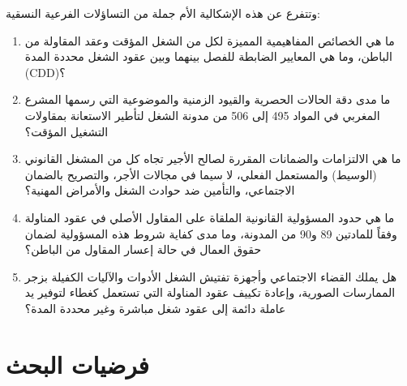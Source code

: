 وتتفرع عن هذه الإشكالية الأم جملة من التساؤلات الفرعية النسقية:
\begin{enumerate}
    \item ما هي الخصائص المفاهيمية المميزة لكل من الشغل المؤقت وعقد المقاولة من الباطن، وما هي المعايير الضابطة للفصل بينهما وبين عقود الشغل محددة المدة (CDD)؟
    \item ما مدى دقة الحالات الحصرية والقيود الزمنية والموضوعية التي رسمها المشرع المغربي في المواد 495 إلى 506 من مدونة الشغل لتأطير الاستعانة بمقاولات التشغيل المؤقت؟
    \item ما هي الالتزامات والضمانات المقررة لصالح الأجير تجاه كل من المشغل القانوني (الوسيط) والمستعمل الفعلي، لا سيما في مجالات الأجر، والتصريح بالضمان الاجتماعي، والتأمين ضد حوادث الشغل والأمراض المهنية؟
    \item ما هي حدود المسؤولية القانونية الملقاة على المقاول الأصلي في عقود المناولة وفقاً للمادتين 89 و90 من المدونة، وما مدى كفاية شروط هذه المسؤولية لضمان حقوق العمال في حالة إعسار المقاول من الباطن؟
    \item هل يملك القضاء الاجتماعي وأجهزة تفتيش الشغل الأدوات والآليات الكفيلة بزجر الممارسات الصورية، وإعادة تكييف عقود المناولة التي تستعمل كغطاء لتوفير يد عاملة دائمة إلى عقود شغل مباشرة وغير محددة المدة؟
\end{enumerate}

\section*{فرضيات البحث}

